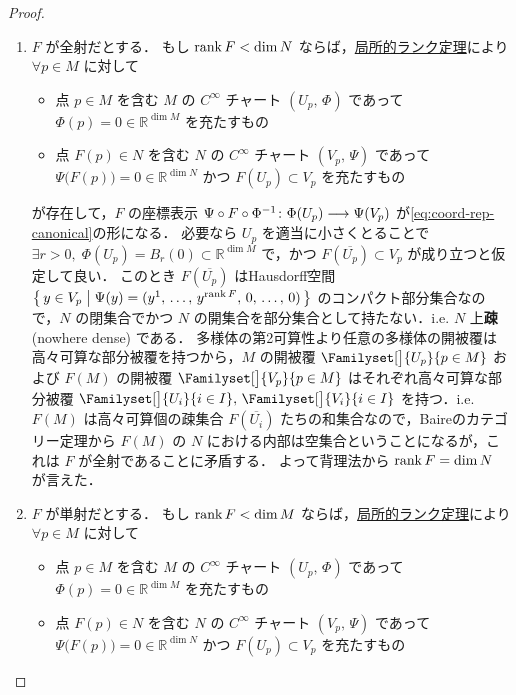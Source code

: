 \documentclass[geometry_main]{subfiles}
\begin{document}
\begin{proof}
    \begin{enumerate}
        \item $F$ が全射だとする．
        もし $\rank F < \dim N$ ならば，\hyperref[thm:rank]{局所的ランク定理}により 
        $\forall p \in M$ に対して
        \begin{itemize}
            \item 点 $p \in M$ を含む $M$ の $C^\infty$ チャート $(U_p,\, \Phi)$ であって $\Phi(p) = 0 \in \mathbb{R}^{\dim M}$ を充たすもの
            \item 点 $F(p) \in N$ を含む $N$ の $C^\infty$ チャート $(V_p,\, \Psi)$ であって $\Psi \bigl( F(p) \bigr) = 0 \in \mathbb{R}^{\dim N}$ かつ $F(U_p) \subset V_p$ を充たすもの
        \end{itemize}
        が存在して，$F$ の座標表示 $\Psi \circ F \circ \Phi^{-1} \colon \Phi(U_p) \longrightarrow \Psi(V_p)$ が\eqref{eq:coord-rep-canonical}の形になる．
        必要なら $U_p$ を適当に小さくとることで $\exists r > 0,\; \Phi(U_p) = B_r (0) \subset \mathbb{R}^{\dim M}$ で，かつ $F(\overline{U_p}) \subset V_p$ が成り立つと仮定して良い．
        このとき $F(\overline{U_p})$ はHausdorff空間 $\bigl\{\, y \in V_p \bigm| \Psi(y) = (y^1,\, \dots,\, y^{\rank F},\, 0,\, \dots,\, 0)  \,\bigr\}$ のコンパクト部分集合なので，$N$ の閉集合でかつ $N$ の開集合を部分集合として持たない．i.e. $N$ 上\textbf{疎} (nowhere dense) である．
        多様体の第2可算性より任意の多様体の開被覆は高々可算な部分被覆を持つから，$M$ の開被覆 $\Familyset[\big]{U_p}{p \in M}$ および $F(M)$ の開被覆 $\Familyset[\big]{V_p}{p \in M}$ はそれぞれ高々可算な部分被覆 $\Familyset[\big]{U_{i}}{i \in I},\, \Familyset[\big]{V_i}{i \in I}$ を持つ．i.e. $F(M)$ は高々可算個の疎集合 $F(\overline{U_i})$ たちの和集合なので，Baireのカテゴリー定理から $F(M)$ の $N$ における内部は空集合ということになるが，これは $F$ が全射であることに矛盾する．
        よって背理法から $\rank F = \dim N$ が言えた．
        \item $F$ が単射だとする．
        もし $\rank F < \dim M$ ならば，\hyperref[thm:rank]{局所的ランク定理}により 
        $\forall p \in M$ に対して
        \begin{itemize}
            \item 点 $p \in M$ を含む $M$ の $C^\infty$ チャート $(U_p,\, \Phi)$ であって $\Phi(p) = 0 \in \mathbb{R}^{\dim M}$ を充たすもの
            \item 点 $F(p) \in N$ を含む $N$ の $C^\infty$ チャート $(V_p,\, \Psi)$ であって $\Psi \bigl( F(p) \bigr) = 0 \in \mathbb{R}^{\dim N}$ かつ $F(U_p) \subset V_p$ を充たすもの

\end{itemize}
\end{enumerate}
\end{proof}
\end{document}
